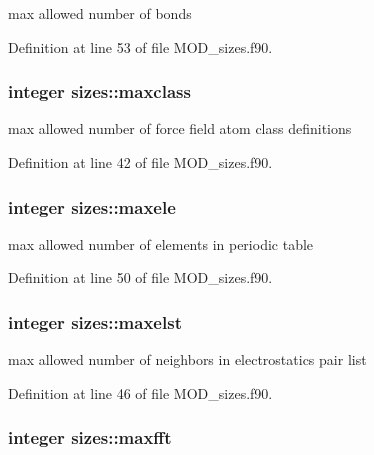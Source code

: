 max allowed number of bonds 



Definition at line 53 of file M\-O\-D\-\_\-sizes.\-f90.

\hypertarget{classsizes_adfda6b1a95ea8e1fe82fec3cddb29d66}{
\subsubsection[{maxclass}]{\setlength{\rightskip}{0pt plus 5cm}integer sizes\-::maxclass}}\label{classsizes_adfda6b1a95ea8e1fe82fec3cddb29d66}


max allowed number of force field atom class definitions 



Definition at line 42 of file M\-O\-D\-\_\-sizes.\-f90.

\hypertarget{classsizes_acb0f20bc59c16f604c05e7f7d8454855}{
\subsubsection[{maxele}]{\setlength{\rightskip}{0pt plus 5cm}integer sizes\-::maxele}}\label{classsizes_acb0f20bc59c16f604c05e7f7d8454855}


max allowed number of elements in periodic table 



Definition at line 50 of file M\-O\-D\-\_\-sizes.\-f90.

\hypertarget{classsizes_a8459ffe6b060ba2472551df9b7768d9d}{
\subsubsection[{maxelst}]{\setlength{\rightskip}{0pt plus 5cm}integer sizes\-::maxelst}}\label{classsizes_a8459ffe6b060ba2472551df9b7768d9d}


max allowed number of neighbors in electrostatics pair list 



Definition at line 46 of file M\-O\-D\-\_\-sizes.\-f90.

\hypertarget{classsizes_a1dd68238fed8b170bf5100a2de4bbbef}{
\subsubsection[{maxfft}]{\setlength{\rightskip}{0pt plus 5cm}integer sizes\-::maxfft}}\label{classsizes_a1dd68238fed8b170bf5100a2de4bbbef}



